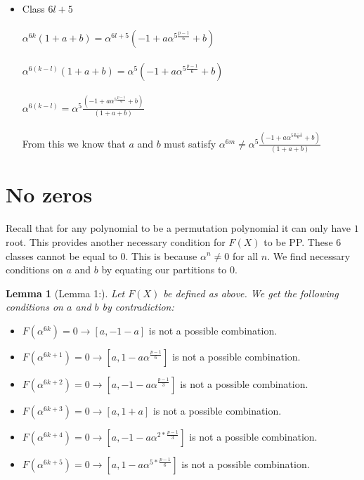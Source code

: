 \documentclass[12pt]{article}
\newtheorem{lemma}{Lemma}
\begin{document}
\begin{itemize}
	\item Class $6l+5$ \\ \\
		$\alpha^{6k}(1+a+b) = \alpha^{6l+5}(-1+a\alpha^{5\frac{p-1}{6}}+b)$
		\\ \\
		$\alpha^{6(k-l)}(1+a+b) = \alpha^{5}(-1+a\alpha^{5\frac{p-1}{6}}+b)$
		\\ \\
		$\alpha^{6(k-l)} = \alpha^{5}\frac{(-1+a\alpha^{5\frac{p-1}{6}}+b)}{(1+a+b)}$
		\\ \\
		From this we know that $a$ and $b$ must satisfy $\alpha^{6m} \neq \alpha^{5}\frac{(-1+a\alpha^{5\frac{p-1}{6}}+b)}{(1+a+b)}$
\end{itemize}

\section{No zeros} %
\label{sec:no_zeros}
Recall that for any polynomial to be a permutation polynomial it can only have $1$ root. This provides another necessary condition for $F(X)$ to be PP. These $6$ classes cannot be equal to $0$. This is because $\alpha^{n} \neq 0$ for all $n$. We find necessary conditions on $a$ and $b$  by equating our partitions to $0$.

\begin{lemma}[Lemma 1:]
	Let $F(X)$ be defined as above. We get the following conditions on $a$ and $b$ by contradiction:
\end{lemma}

\begin{itemize}
	\item $F(\alpha^{6k}) = 0 \rightarrow [a,-1-a]$ is not a possible combination.
	\item $F(\alpha^{6k+1}) = 0 \rightarrow [a,1-a\alpha^{\frac{p-1}{6}}]$ is not a possible combination.
	\item $F(\alpha^{6k+2}) = 0 \rightarrow [a,-1-a\alpha^{\frac{p-1}{3}}]$ is not a possible combination.
	\item $F(\alpha^{6k+3}) = 0 \rightarrow [a,1+a]$ is not a possible combination.
	\item $F(\alpha^{6k+4}) = 0 \rightarrow [a,-1-a\alpha^{2*\frac{p-1}{3}}]$ is not a possible combination.
	\item $F(\alpha^{6k+5}) = 0 \rightarrow [a,1-a\alpha^{5*\frac{p-1}{6}}]$ is not a possible combination. 
\end{itemize}
\end{document}
